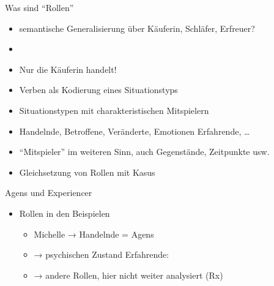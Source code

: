 \begin{frame}
  {Was sind "`Rollen"'}
  \pause
  \begin{exe}
    \ex
    \begin{xlist}
      \pause
      \pause
    \end{xlist}
  \end{exe}
  \pause
  \Halbzeile
  \begin{itemize}[<+->]
    \item semantische Generalisierung über \alert{Käuferin}, \alert{Schläfer}, \alert{Erfreuer}?
    \item {}
    \item Nur die \alert{Käuferin} handelt!
      \Halbzeile
    \item Verben als Kodierung eines \alert{Situationstyps} 
    \item Situationstypen mit charakteristischen \alert{Mitspielern}
    \item Handelnde, Betroffene, Veränderte, Emotionen Erfahrende, \ldots
    \item "`Mitspieler"' im weiteren Sinn, auch Gegenstände, Zeitpunkte usw.
      \Halbzeile
    \item Gleichsetzung von Rollen mit Kasus 
  \end{itemize}
\end{frame}

\begin{frame}
  {Agens und Experiencer}
  \pause
  \begin{exe}
    \ex
    \begin{xlist}
    \end{xlist}
  \end{exe}
  \pause
  \Halbzeile
  \begin{itemize}[<+->]
    \item Rollen in den Beispielen
      \begin{itemize}[<+->]
        \item \alert{Michelle} → Handelnde = \alert{Agens}
        \item {} → psychischen Zustand Erfahrende: 
        \item {} → andere Rollen, hier nicht weiter analysiert (Rx)
      \end{itemize}
  \end{itemize}
\end{frame}

